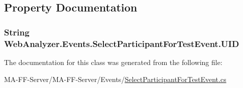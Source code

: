 \subsection{Property Documentation}
\hypertarget{class_web_analyzer_1_1_events_1_1_select_participant_for_test_event_a1749346fd01c6ff1a5561aa99d797dcc}{}
\subsubsection[{U\+I\+D}]{\setlength{\rightskip}{0pt plus 5cm}String Web\+Analyzer.\+Events.\+Select\+Participant\+For\+Test\+Event.\+U\+I\+D\hspace{0.3cm}{\ttfamily [get]}}\label{class_web_analyzer_1_1_events_1_1_select_participant_for_test_event_a1749346fd01c6ff1a5561aa99d797dcc}


The documentation for this class was generated from the following file\+:\begin{DoxyCompactItemize}
\item 
M\+A-\/\+F\+F-\/\+Server/\+M\+A-\/\+F\+F-\/\+Server/\+Events/\hyperlink{_select_participant_for_test_event_8cs}{Select\+Participant\+For\+Test\+Event.\+cs}\end{DoxyCompactItemize}
